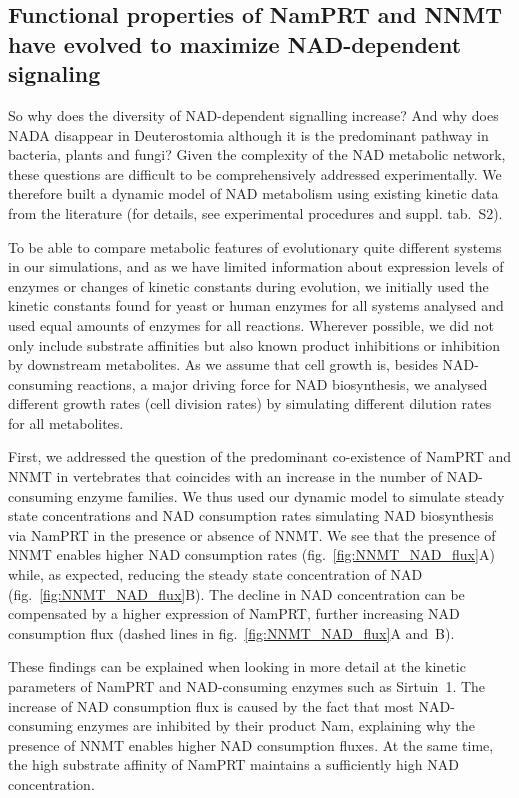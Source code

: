 \subsection{Functional properties of NamPRT and NNMT have evolved to maximize NAD-dependent signaling}

So why does the diversity of NAD-dependent signalling increase? And why does NADA disappear in Deuterostomia although it is the predominant pathway in bacteria, plants and fungi? Given the complexity of the NAD metabolic network, these questions are difficult to be comprehensively addressed experimentally. We therefore built a dynamic model of NAD metabolism using existing kinetic data from the literature (for details, see experimental procedures and suppl. tab.~S2).

To be able to compare metabolic features of evolutionary quite different systems in our simulations, and as we have limited information about expression levels of enzymes or changes of kinetic constants during evolution, we initially used the kinetic constants found for yeast or human enzymes for all systems analysed and used equal amounts of enzymes for all reactions. Wherever possible, we did not only include substrate affinities but also known product inhibitions or inhibition by downstream metabolites. As we assume that cell growth is, besides NAD-consuming reactions, a major driving force for NAD biosynthesis, we analysed different growth rates (cell division rates) by simulating different dilution rates for all metabolites.

First, we addressed the question of the predominant co-existence of NamPRT and NNMT in vertebrates that coincides with an increase in the number of NAD-consuming enzyme families. We thus used our dynamic model to simulate steady state concentrations and NAD consumption rates simulating NAD biosynthesis via NamPRT in the presence or absence of NNMT. We see that the presence of NNMT enables higher NAD consumption rates (fig.~\ref{fig:NNMT_NAD_flux}A) while, as expected, reducing the steady state concentration of NAD (fig.~\ref{fig:NNMT_NAD_flux}B). The decline in NAD concentration can be compensated by a higher expression of NamPRT, further increasing NAD consumption flux (dashed lines in fig.~\ref{fig:NNMT_NAD_flux}A and~B).

These findings can be explained when looking in more detail at the kinetic parameters of NamPRT and NAD-consuming enzymes such as Sirtuin~1. The increase of NAD consumption flux is caused by the fact that most NAD-consuming enzymes are inhibited by their product Nam, explaining why the presence of NNMT enables higher NAD consumption fluxes. At the same time, the high substrate affinity of NamPRT maintains a sufficiently high NAD concentration.


